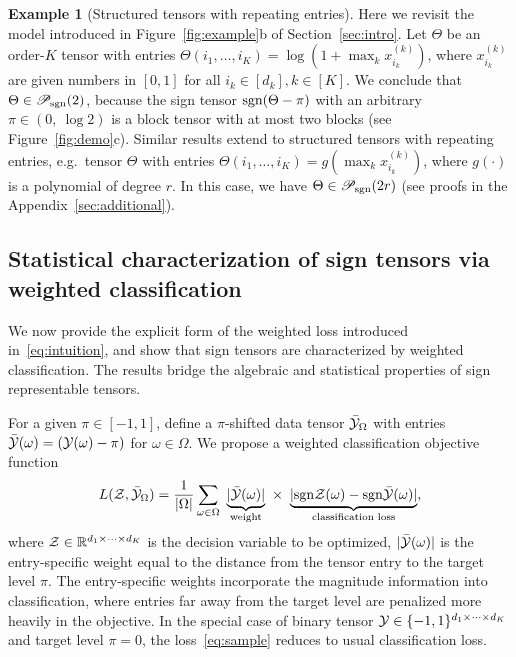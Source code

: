 \documentclass{article}
\theoremstyle{plain}
\theoremstyle{definition}
\newtheorem{example}{Example}
\newcommand*{\KeepStyleUnderBrace}[1]{%
  \mathop{%
    \mathchoice
    {\underbrace{\displaystyle#1}}%
    {\underbrace{\textstyle#1}}%
    {\underbrace{\scriptstyle#1}}%
    {\underbrace{\scriptscriptstyle#1}}%
  }\limits
}
\def\sign{\textup{sgn}}
\def\caliP{\mathscr{P}_{\textup{sgn}}}
\begin{document}
\begin{example}[Structured tensors with repeating entries]\label{eq:example} Here we revisit the model introduced in Figure~\ref{fig:example}b of Section~\ref{sec:intro}. Let $\Theta$ be an order-$K$ tensor with entries $\Theta(i_1,\ldots,i_K)=\log(1+\max_kx^{(k)}_{i_k})$, where $x^{(k)}_{i_k}$ are given numbers in $[0,1]$ for all $i_k\in[d_k], k\in[K]$. We conclude that $\Theta \in \caliP(2)$, because the sign tensor $\sign(\Theta-\pi)$ with an arbitrary $\pi\in(0,\ \log 2)$ is a block tensor with at most two blocks (see Figure~\ref{fig:demo}c). Similar results extend to structured tensors with repeating entries, e.g.\ tensor $\Theta$ with entries $\Theta(i_1,\ldots,i_K)=g(\max_kx^{(k)}_{i_k})$, where $g(\cdot)$ is a polynomial of degree $r$. In this case, we have $\Theta\in \caliP(2r)$ (see proofs in the Appendix~\ref{sec:additional}). 
\end{example}

\vspace{-.2cm}
\subsection{Statistical characterization of sign tensors via weighted classification}\label{sec:identifiability}
\vspace{-.2cm}
We now provide the explicit form of the weighted loss introduced in~\eqref{eq:intuition}, and show that sign tensors are characterized by weighted classification. The results bridge the algebraic and statistical properties of sign representable tensors.
 
For a given $\pi \in [-1,1]$, define a $\pi$-shifted data tensor $\bar {\mathcal{Y}}_\Omega$ with entries $\bar {\mathcal{Y}}(\omega) = (\mathcal{Y}(\omega)-\pi)$ for $\omega\in \Omega$. We propose a weighted classification objective function
\begin{equation}\label{eq:sample}
L(\tZ, \bar \tY_\Omega)= {1\over |\Omega|}\sum_{\omega \in \Omega}\ \KeepStyleUnderBrace{|\bar \tY(\omega)|}_{\text{weight}}\  \times \ \KeepStyleUnderBrace{| \sign \tZ(\omega)-\sign \bar \tY(\omega)|}_{\text{classification loss}},
\end{equation}
where $\mathcal{Z}\in\mathbb{R}^{d_1\times \cdots \times d_K}$ is the decision variable to be optimized, $|\bar {\mathcal{Y}}(\omega)|$ is the entry-specific weight equal to the distance from the tensor entry to the target level $\pi$. The entry-specific weights incorporate the magnitude information into classification, where entries far away from the target level are penalized more heavily in the objective. In the special case of binary tensor $\mathcal{Y}\in\{-1,1\}^{d_1\times\cdots\times d_K}$ and target level $\pi=0$, the loss~\eqref{eq:sample} reduces to usual classification loss. 
\end{document}

